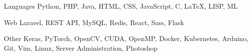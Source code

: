 

\begin{cvskills}

  \cvskill
    {Languages} %
    {Python, PHP, Java, HTML, CSS, JavaScript, C, \LaTeX, LISP, ML} %

  \cvskill
    {Web} %
    {Laravel, REST API, MySQL, Redis, React, Sass, Flask} %

  \cvskill
    {Other} %
    {Keras, PyTorch, OpenCV, CUDA, OpenMP, Docker, Kubernetes, Arduino, Git, Vim, Linux, Server Administration, Photoshop} %

\end{cvskills}
